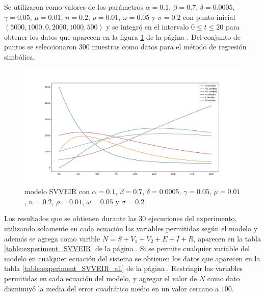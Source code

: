 Se utilizaron como valores de los parámetros $\alpha = 0.1$, $\beta = 0.7$, $\delta = 0.0005$, $\gamma = 0.05$, $\mu = 0.01$, $n = 0.2$, $\rho = 0.01$, $\omega = 0.05$ y $\sigma = 0.2$ con punto inicial $(5000, 1000, 0, 2000, 1000, 500)$ y se integró en el intervalo $0 \leq t \leq 20$ para obtener los datos que aparecen en la figura \ref{fig:SVVEIR} de la página \pageref{fig:SVVEIR}. Del conjunto de puntos se seleccionaron 300 muestras como datos para el método de regresión simbólica.

\begin{figure}[h]
    \centering
    \includegraphics[width=\textwidth]{"figures/SVVEIR.pdf"}
    \caption{modelo SVVEIR con $\alpha = 0.1$, $\beta = 0.7$, $\delta = 0.0005$, $\gamma = 0.05$, $\mu = 0.01$, $n = 0.2$, $\rho = 0.01$, $\omega = 0.05$ y $\sigma = 0.2$.}
    \label{fig:SVVEIR}
\end{figure}

Los resultados que se obtienen durante las 30 ejecuciones del experimento, utilizando solamente en cada ecuación las variables permitidas según el modelo y además se agrega como varible $N=S + V_1 + V_2 + E + I + R$, aparecen en la tabla \ref{table:experiment_SVVEIR} de la página \pageref{table:experiment_SVVEIR}. Si se permite cualquier variable del modelo en cualquier ecuación del sistema se obtienen los datos que aparecen en la tabla \ref{table:experiment_SVVEIR_all} de la página \pageref{table:experiment_SVVEIR_all}. Restringir las variables permitidas en cada ecuación del modelo, y agregar el valor de $N$ como dato disminuyó la media del error cuadrático medio en un valor cercano a $100$.

